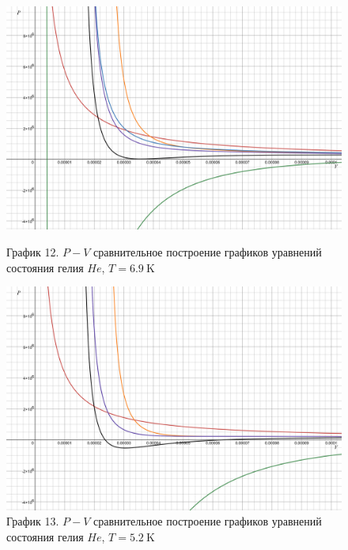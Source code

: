 \documentclass[a4paper]{article}
\numberwithin{equation}{subsection} %
\begin{document}
\begin{figure}[h!]
    \centering
    \begin{minipage}{0.49\textwidth}
        \centering
        \includegraphics[width=\linewidth]{Graphics/He/6_9.png}
        \caption{\label{fig:clausius_1}График 12. $P-V$ сравнительное построение графиков уравнений состояния гелия $He$, $T = 6.9 \ \text{K}$}
    \end{minipage}
    \hfill
    \begin{minipage}{0.49\textwidth}
        \centering
        \includegraphics[width=\linewidth]{Graphics/He/5_2.png}
        \caption{\label{fig:clausius_1}График 13. $P-V$ сравнительное построение графиков уравнений состояния гелия $He$, $T = 5.2 \ \text{K}$}
    \end{minipage}
\end{figure}
\end{document}
